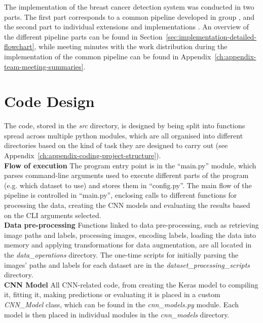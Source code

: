 The implementation of the breast cancer detection system was conducted in two parts. The first part corresponds to a common pipeline developed in group \citep{adam_jaamour_2020_3975093}, and the second part to individual extensions and implementations \citep{adam_jaamour_2020_src}. An overview of the different pipeline parts can be found in Section~\ref{sec:implementation-detailed-flowchart}, while meeting minutes with the work distribution during the implementation of the common pipeline can be found in Appendix~\ref{ch:appendix-team-meeting-summaries}.


\section{Code Design}

The code, stored in the \textit{src} directory, is designed by being split into functions spread across multiple python modules, which are all organised into different directories based on the kind of task they are designed to carry out (see Appendix~\ref{ch:appendix-coding-project-structure}).\\

\textbf{Flow of execution} \space The program entry point is in the ``main.py'' module, which parses command-line arguments used to execute different parts of the program (e.g. which dataset to use) and stores them in ``config.py''. The main flow of the pipeline is controlled in ``main.py'', enclosing calls to different functions for processing the data, creating the CNN models and evaluating the results based on the CLI arguments selected.\\

\textbf{Data pre-processing} \space Functions linked to data pre-processing, such as retrieving image paths and labels, processing images, encoding labels, loading the data into memory and applying transformations for data augmentation, are all located in the \textit{data\_operations} directory. The one-time scripts for initially parsing the images' paths and labels for each dataset are in the \textit{dataset\_processing\_scripts} directory.\\

\textbf{CNN Model} \space All CNN-related code, from creating the Keras model to compiling it, fitting it, making predictions or evaluating it is placed in a custom \textit{CNN\_Model} class, which can be found in the \textit{cnn\_models.py} module. Each model is then placed in individual modules in the \textit{cnn\_models} directory.\\

